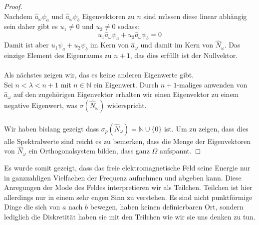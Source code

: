 \documentclass[11pt,a4paper,leqno]{report}
\numberwithin{equation}{chapter}
\begin{document}
\begin{proof}
\\
Nachdem $\hat{a}_\omega\psi_a$ und $\hat{a}_\omega\psi_b$ Eigenvektoren zu $n$ sind m\"ussen diese linear abh\"angig sein daher gibt es $u_1\neq0$ und $u_2\neq 0$ sodass:
\begin{equation*}
	u_1\hat{a}_\omega\psi_a+u_2\hat{a}_\omega\psi_b=0
\end{equation*}
Damit ist aber $u_1\psi_a+u_2\psi_b$ im Kern von $\hat{a}_\omega$ und damit im Kern von $\hat{N}_\omega$.
Das einzige Element des Eigenraums zu $n+1$, das dies erf\"ullt ist der Nullvektor.\\
\\
Als n\"achstes zeigen wir, das es keine anderen Eigenwerte gibt.\\
Sei $n<\lambda<n+1$ mit $n\in\mathbb{N}$ ein Eigenwert. Durch $n+1$-maliges anwenden von $\hat{a}_\omega$ auf den zugeh\"origen Eigenvektor erhalten wir einen Eigenvektor zu einem negative Eigenwert, was $\sigma(\hat{N}_\omega)$ widerspricht.\\
\\
Wir haben bislang gezeigt dass $\sigma_p(\hat{N}_\omega)=
\mathbb{N}\cup\{0\}$ ist. Um zu zeigen, dass dies alle Spektralwerte sind reicht es zu bemerken, dass die Menge der Eigenvektoren von $\hat{N}_\omega$ ein Orthogonalsystem bilden, dass ganz $\Omega$ aufspannt.\end{proof}
\noindent
Es wurde somit gezeigt, dass das freie elektromagnetische Feld seine Energie nur in ganzzahligen Vielfachen der Frequenz aufnehmen und abgeben kann. Diese Anregungen der Mode des Feldes interpretieren wir als Teilchen. Teilchen ist hier allerdings nur in einem sehr engen Sinn zu verstehen. Es sind nicht punktf\"ormige Dinge die sich von $a$ nach $b$ bewegen, haben keinen definierbaren Ort, sondern lediglich die Diskretit\"at haben sie mit den Teilchen wie wir sie uns denken zu tun.
\end{document}
